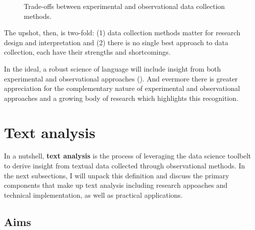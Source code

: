 \documentclass[
  letterpaper,
]{latex/krantz}
\theoremstyle{definition}
\theoremstyle{remark}
\begin{document}
\begin{figure}[H]


\caption{\label{fig-data-collection-methods}Trade-offs between
experimental and observational data collection methods.}

\end{figure}%

The upshot, then, is two-fold: (1) data collection methods matter for
research design and interpretation and (2) there is no single best
approach to data collection, each have their strengths and shortcomings.

In the ideal, a robust science of language will include insight from
both experimental and observational approaches
(). And evermore there
is greater appreciation for the complementary nature of experimental and
observational approaches and a growing body of research which highlights
this recognition.

\section{Text analysis}\label{text-analysis}

In a nutshell, \textbf{text analysis} is the
process of leveraging the data science toolbelt to derive insight from
textual data collected through observational methods. In the next
subsections, I will unpack this definition and discuss the primary
components that make up text analysis including research appoaches and
technical implementation, as well as practical applications.

\subsection{Aims}\label{aims}
\end{document}
